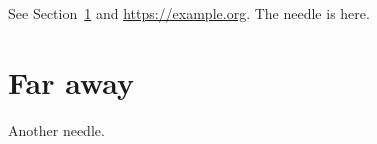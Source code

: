 \documentclass{article}
\begin{document}
See Section~\ref{sec:far} and \url{https://example.org}.
The needle is here.
\newpage
\section{Far away}
\label{sec:far}
Another needle.
\end{document}

